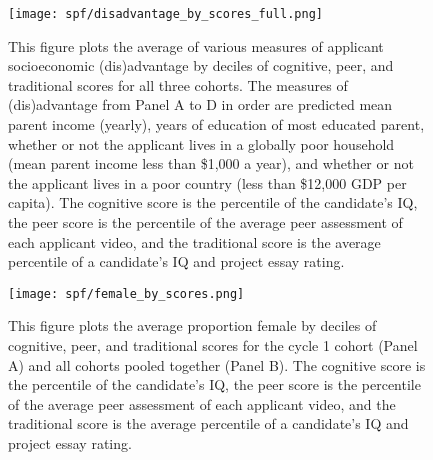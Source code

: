    \newpage
    \begin{figure}[!htb]
    \centering
        \caption{This figure plots the average of various measures of applicant socioeconomic (dis)advantage by deciles of cognitive, peer, and traditional scores for all three cohorts. The measures of (dis)advantage from Panel A to D in order are predicted mean parent income (yearly), years of education of most educated parent, whether or not the applicant lives in a globally poor household (mean parent income less than \$1,000 a year), and whether or not the applicant lives in a poor country (less than \$12,000 GDP per capita). The cognitive score is the percentile of the candidate's IQ, the peer score is the percentile of the average peer assessment of each applicant video, and the traditional score is the average percentile of a candidate's IQ and project essay rating. }
        \label{fig:disadvantage_corr_full}
      \texttt{[image: spf/disadvantage\_by\_scores\_full.png]} 
    \end{figure}
    
    \newpage
    \begin{figure}[!htb]
    \centering
        \caption{This figure plots the average proportion female by deciles of cognitive, peer, and traditional scores for the cycle 1 cohort (Panel A) and all cohorts pooled together (Panel B). The cognitive score is the percentile of the candidate's IQ, the peer score is the percentile of the average peer assessment of each applicant video, and the traditional score is the average percentile of a candidate's IQ and project essay rating.}
        \label{fig:alt_female_cor}
        \texttt{[image: spf/female\_by\_scores.png]} 
    \end{figure}
    
    
    \newpage
    
